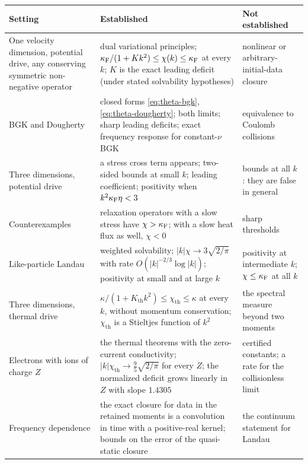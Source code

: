 \begin{center}
\renewcommand{\arraystretch}{1.3}
\begin{tabularx}{\textwidth}{@{}P{3.7cm}YP{3.7cm}@{}}
\toprule
Setting & Established & Not established \\
\midrule
One velocity dimension, potential drive, any conserving symmetric
non-negative operator
  & dual variational principles;
    $\kappa_{\mathrm F}/(1+Kk^2)\le\chi(k)\le\kappa_{\mathrm F}$ at every $k$; $K$ is the exact leading
    deficit (under stated solvability hypotheses)
  & nonlinear or arbitrary-initial-data closure \\
BGK and Dougherty
  & closed forms \eqref{eq:theta-bgk}, \eqref{eq:theta-dougherty}; both
    limits; sharp leading deficits; exact frequency response for
    constant-$\nu$ BGK
  & equivalence to Coulomb collisions \\
Three dimensions, potential drive
  & a stress cross term appears; two-sided bounds at small $k$; leading
    coefficient; positivity when $k^2\kappa_{\mathrm F}\eta<3$
  & bounds at all $k$: they are false in general \\
Counterexamples
  & relaxation operators with a slow stress have $\chi>\kappa_{\mathrm F}$; with a slow
    heat flux as well, $\chi<0$
  & sharp thresholds \\
Like-particle Landau
  & weighted solvability; $|k|\chi\to3\sqrt{2/\pi}$ with rate
    $O(|k|^{-2/3}\log|k|)$; positivity at small and at large $k$
  & positivity at intermediate $k$; $\chi\le\kappa_{\mathrm F}$ at all $k$ \\
Three dimensions, thermal drive
  & $\kappa/(1+K_{\mathrm{th}}k^2)\le\chi_{\mathrm{th}}\le\kappa$ at every
    $k$, without momentum conservation; $\chi_{\mathrm{th}}$ is a Stieltjes
    function of $k^2$
  & the spectral measure beyond two moments \\
Electrons with ions of charge $Z$
  & the thermal theorems with the zero-current conductivity;
    $|k|\chi_{\mathrm{th}}\to\tfrac95\sqrt{2/\pi}$ for every $Z$; the
    normalized deficit grows linearly in $Z$ with slope $1.4305$
  & certified constants; a rate for the collisionless limit \\
Frequency dependence
  & the exact closure for data in the retained moments is a convolution in
    time with a positive-real kernel; bounds on the error of the
    quasi-static closure
  & the continuum statement for Landau \\
\bottomrule
\end{tabularx}
\end{center}

